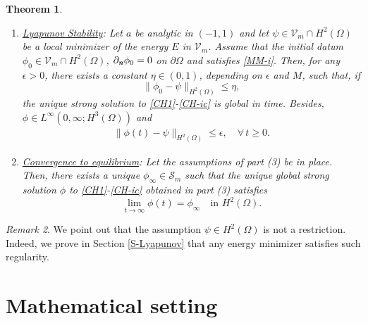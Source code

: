 \documentclass[11pt,reqno]{amsart}
\newtheorem{theorem}{Theorem}[section]
\theoremstyle{remark}
\newtheorem{remark}[theorem]{Remark}
\def\n{\textbf{\textit{n}}}
\def\div{\mathrm{div}}
\numberwithin{equation}{section}
\newcommand{\vp}{\phi}
\begin{document}
\begin{theorem}
\begin{enumerate}
\medskip

\item \underline{Lyapunov Stability}: Let $a$ be analytic in $(-1,1)$ and let $\psi\in \mathcal{V}_m\cap H^2(\Omega)$ be a local minimizer of the energy $E$ in $\mathcal{V}_m$.
Assume that the initial datum $\phi_0\in \mathcal{V}_m\cap H^2(\Omega)$, $\partial_\n \phi_0=0$ on $\partial \Omega$ and satisfies \eqref{MM-i}.
Then, for any $\epsilon>0$, there exists a constant $\eta\in (0,1)$, depending on $\epsilon$ and $M$, such that, if
$$\|\vp_0-\psi\|_{H^2(\Omega)}\leq \eta,$$ the unique strong solution to  \eqref{CH1}-\eqref{CH-ic} is global in time. Besides, $\phi\in L^\infty(0,\infty; H^3(\Omega))$
and 
\begin{align}
\|\vp(t)-\psi\|_{H^2(\Omega)} \leq \epsilon,\quad \forall\, t\geq 0.\nonumber
\end{align}

\item \underline{Convergence to equilibrium}: Let the assumptions of part (3) be in place. Then, there exists a unique $\phi_\infty \in \mathcal{S}_m$ such that the unique global strong solution $\phi$ to  \eqref{CH1}-\eqref{CH-ic} obtained in part (3) satisfies
$$\lim_{t\to\infty}\phi(t)=\phi_\infty\quad \text{in } H^2(\Omega).$$

\end{enumerate}
\end{theorem}
\begin{remark}
We point out that the assumption $\psi\in H^2(\Omega)$ is not a restriction. Indeed, we prove in Section \ref{S-Lyapunov} that any energy minimizer satisfies such regularity.
\end{remark}
\section{Mathematical setting}
\label{S-Mathset}
\end{document}
